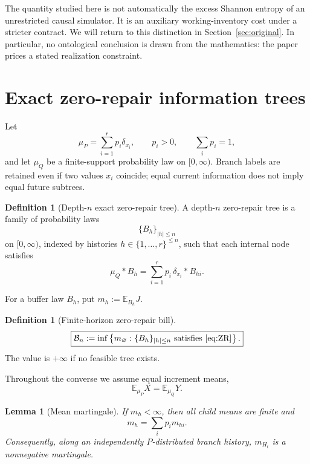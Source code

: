 \documentclass[11pt,a4paper]{article}
\newtheorem{lemma}[theorem]{Lemma}
\theoremstyle{definition}
\newtheorem{definition}[theorem]{Definition}
\theoremstyle{remark}
\newcommand{\E}{\mathbb E}
\newcommand{\cB}{\mathcal B}
\begin{document}
The quantity studied here is not automatically the excess Shannon entropy of
an unrestricted causal simulator.  It is an auxiliary working-inventory cost
under a stricter contract.  We will return to this distinction in
Section~\ref{sec:original}.  In particular, no ontological conclusion is drawn
from the mathematics: the paper prices a stated realization constraint.

\section{Exact zero-repair information trees}
\label{sec:model}

Let
\[
 \mu_P=\sum_{i=1}^r p_i\delta_{x_i},
 \qquad p_i>0,
 \qquad \sum_i p_i=1,
\]
and let \(\mu_Q\) be a finite-support probability law on \([0,\infty)\).
Branch labels are retained even if two values \(x_i\) coincide; equal current
information does not imply equal future subtrees.

\begin{definition}[Depth-\(n\) exact zero-repair tree]
A depth-\(n\) zero-repair tree is a family of probability laws
\[
 \{B_h\}_{|h|\le n}
\]
on \([0,\infty)\), indexed by histories
\(h\in\{1,\ldots,r\}^{\le n}\), such that each internal node satisfies
\begin{equation}
 \boxed{
 \mu_Q*B_h
 =
 \sum_{i=1}^r p_i\,\delta_{x_i}*B_{hi}.
 }
 \label{eq:ZR}
\end{equation}
\end{definition}

For a buffer law \(B_h\), put \(m_h:=\E_{B_h}J\).

\begin{definition}[Finite-horizon zero-repair bill]
\begin{equation}
 \boxed{
 \cB_n:=\inf\left\{m_\varnothing:
 \{B_h\}_{|h|\le n}\text{ satisfies \eqref{eq:ZR}}\right\}.
 }
 \label{eq:bill}
\end{equation}
The value is \(+\infty\) if no feasible tree exists.
\end{definition}

Throughout the converse we assume equal increment means,
\begin{equation}
 \E_{\mu_P}X=\E_{\mu_Q}Y.
 \label{eq:equalmean}
\end{equation}

\begin{lemma}[Mean martingale]
If \(m_h<\infty\), then all child means are finite and
\begin{equation}
 \boxed{m_h=\sum_i p_i m_{hi}.}
 \label{eq:meanmart}
\end{equation}
Consequently, along an independently \(P\)-distributed branch history,
\(m_{H_t}\) is a nonnegative martingale.
\end{lemma}
\end{document}
